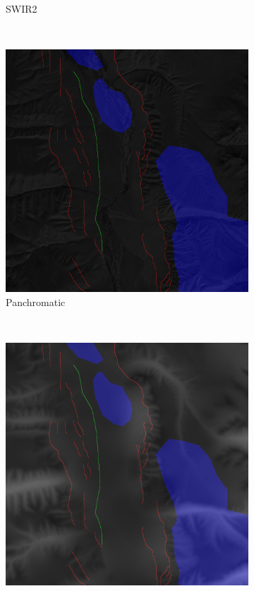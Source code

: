 \documentclass[11pt,a4paper]{article}
\begin{document}
\begin{figure}[t]
\begin{subfigure}[b]{0.18\textwidth}
        \caption{SWIR2}
        \label{fig:features_swir2}
    \end{subfigure}
    ~
    \begin{subfigure}[b]{0.18\textwidth}
        \includegraphics[width=\textwidth]{graphics/data/0/features_panchromatic.png}
        \caption{Panchromatic}
        \label{fig:features_panchromatic}
    \end{subfigure}
    ~
    \begin{subfigure}[b]{0.18\textwidth}
        \includegraphics[width=\textwidth]{graphics/data/0/features_erosion.png}

\end{subfigure}
\end{figure}
\end{document}
